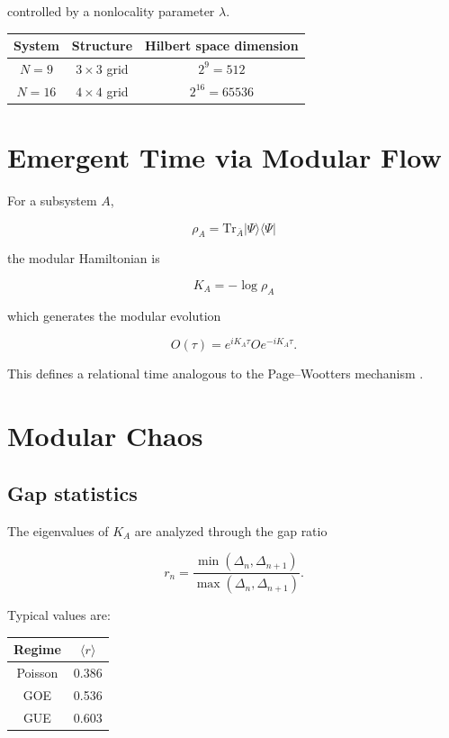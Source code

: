 \documentclass[11pt]{article}
\begin{document}
controlled by a nonlocality parameter $\lambda$.

\begin{center}
\begin{tabular}{ccc}
\toprule
System & Structure & Hilbert space dimension \\
\midrule
$N=9$ & $3\times3$ grid & $2^9=512$ \\
$N=16$ & $4\times4$ grid & $2^{16}=65536$ \\
\bottomrule
\end{tabular}
\end{center}


\section{Emergent Time via Modular Flow}

For a subsystem $A$,

\[
\rho_A = \mathrm{Tr}_{\bar A} |\Psi\rangle\langle\Psi|
\]

the modular Hamiltonian is

\[
K_A = -\log\rho_A
\]

which generates the modular evolution

\[
O(\tau)=e^{iK_A\tau}Oe^{-iK_A\tau}.
\]

This defines a relational time analogous to the Page--Wootters mechanism \cite{pagewootters}.

\section{Modular Chaos}

\subsection{Gap statistics}

The eigenvalues of $K_A$ are analyzed through the gap ratio

\[
r_n=\frac{\min(\Delta_n,\Delta_{n+1})}{\max(\Delta_n,\Delta_{n+1})}.
\]

Typical values are:

\begin{center}
\begin{tabular}{cc}
\toprule
Regime & $\langle r\rangle$ \\
\midrule
Poisson & 0.386 \\
GOE & 0.536 \\
GUE & 0.603 \\
\bottomrule
\end{tabular}
\end{center}
\end{document}

